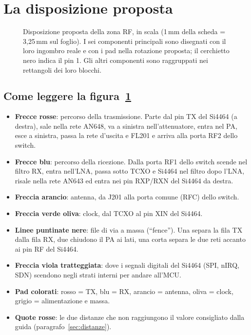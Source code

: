 \documentclass[a4paper,11pt]{article}
\begin{document}
\section{La disposizione proposta}

\begin{figure}[H]
\centering

\caption{Disposizione proposta della zona RF, in scala (1\,mm della scheda = 3,25\,mm sul foglio). I sei componenti principali sono disegnati con il loro ingombro reale e con i pad nella rotazione proposta; il cerchietto nero indica il pin 1. Gli altri componenti sono raggruppati nei rettangoli dei loro blocchi.}
\label{fig:proposta}
\end{figure}

\subsection*{Come leggere la figura~\ref{fig:proposta}}
\begin{itemize}
\item \textbf{Frecce rosse}: percorso della trasmissione. Parte dal pin TX del Si4464 (a destra), sale nella rete AN648, va a sinistra nell'attenuatore, entra nel PA, esce a sinistra, passa la rete d'uscita e FL201 e arriva alla porta RF2 dello switch.
\item \textbf{Frecce blu}: percorso della ricezione. Dalla porta RF1 dello switch scende nel filtro RX, entra nell'LNA, passa sotto TCXO e Si4464 nel filtro dopo l'LNA, risale nella rete AN643 ed entra nei pin RXP/RXN del Si4464 da destra.
\item \textbf{Freccia arancio}: antenna, da J201 alla porta comune (RFC) dello switch.
\item \textbf{Freccia verde oliva}: clock, dal TCXO al pin XIN del Si4464.
\item \textbf{Linee puntinate nere}: file di via a massa (\enquote{fence}). Una separa la fila TX dalla fila RX, due chiudono il PA ai lati, una corta separa le due reti accanto ai pin RF del Si4464.
\item \textbf{Freccia viola tratteggiata}: dove i segnali digitali del Si4464 (SPI, nIRQ, SDN) scendono negli strati interni per andare all'MCU.
\item \textbf{Pad colorati}: rosso = TX, blu = RX, arancio = antenna, oliva = clock, grigio = alimentazione e massa.
\item \textbf{Quote rosse}: le due distanze che non raggiungono il valore consigliato dalla guida (paragrafo~\ref{sec:distanze}).
\end{itemize}
\end{document}

